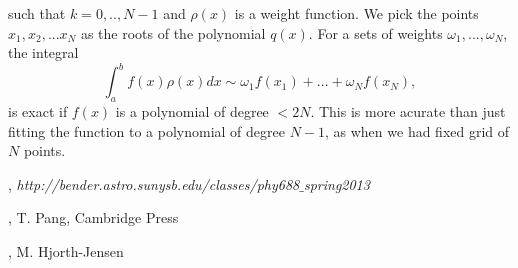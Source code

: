 \documentclass[11pt]{article}
\begin{document}
such that $k=0,..,N-1$ and $\rho(x)$ is a weight function. We pick the points $x_1, x_2, ...x_N$ as the roots of the polynomial $q(x)$. For a sets of weights $\omega_1,...,\omega_N$, the integral
$$\int_a^b f(x)\rho(x) dx \sim \omega_1 f(x_1) + ... +\omega_N f(x_N),$$
is exact if $f(x)$ is a polynomial of degree $<2N$. This is more acurate than just fitting the function to a polynomial of degree $N-1$, as when we had fixed grid of $N$ points.


\quad


\quad

\clearpage





\begin{thebibliography}{}

, {\it http://bender.astro.sunysb.edu/classes/phy688$\_$spring2013}

, T. Pang, Cambridge Press

, M. Hjorth-Jensen


\end{thebibliography}
\end{document}
